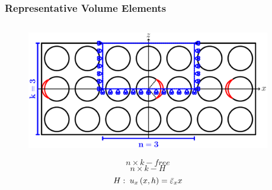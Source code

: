 \documentclass[first,firstsupp,lastsupp,last,hyperref,table]{ETHclass}
\begin{document}
\begin{frame}
\frametitle{\vspace{0.2cm}\small Representative Volume Elements}
\vspace{-1cm}
\centering
\begin{columns}[c]
\begin{column}{0.55\textwidth}
\centering
\begin{figure}
\centering
\includegraphics[width=\columnwidth]{freeThickPly.pdf}
\end{figure}
\vspace{-0.25cm}
\begin{equation*}
n\times k-free
\end{equation*}
\begin{equation*}
n\times k-H
\end{equation*}
\begin{equation*}
\scriptsize
H:\ u_{x}\left(x,h\right)=\bar{\varepsilon}_{x}x
\end{equation*}
\end{column}
\begin{column}{0.45\textwidth}
\centering
\end{column}
\end{columns}
\end{frame}

\addtocounter{framenumber}{-1}
\end{document}
